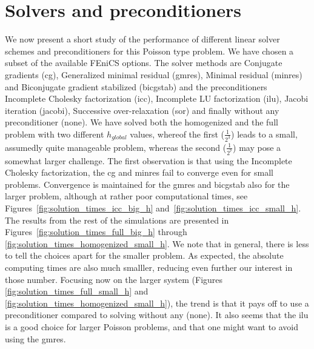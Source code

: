 \documentclass{article}
\begin{document}
  \section{Solvers and preconditioners}
  We now present a short study of the performance of different linear solver schemes and preconditioners for this Poisson type problem. We have chosen a subset of the available FEniCS options. The solver methods are Conjugate gradients (cg), Generalized minimal residual (gmres), Minimal residual (minres) and Biconjugate gradient stabilized (bicgstab) and the preconditioners Incomplete Cholesky factorization (icc), Incomplete LU factorization (ilu),  Jacobi iteration (jacobi), Successive over-relaxation (sor) and finally without any preconditioner (none). We have solved both the homogenized and the full problem with two different $h_{global}$ values, whereof the first ($\frac{1}{2^3}$) leads to a small, assumedly quite manageable problem, whereas the second ($\frac{1}{2^7}$) may pose a somewhat larger challenge.
  The first observation is that using the Incomplete Cholesky factorization, the cg and minres fail to converge even for small problems. Convergence is maintained for the gmres and bicgstab also for the larger problem, although at rather poor computational times, see Figures~\ref{fig:solution_times_icc_big_h} and~\ref{fig:solution_times_icc_small_h}. The results from the rest of the simulations are presented in Figures~\ref{fig:solution_times_full_big_h} through \ref{fig:solution_times_homogenized_small_h}. We note that in general, there is less to tell the choices apart for the smaller problem. As expected, the absolute computing times are also much smalller, reducing even further our interest in those number. Focusing now on the larger system (Figures \ref{fig:solution_times_full_small_h} and \ref{fig:solution_times_homogenized_small_h}), the trend is that it pays off to use a preconditioner compared to solving without any (none). It also seems that the ilu is a good choice for larger Poisson problems, and that one might want to avoid using the gmres.
\end{document}
